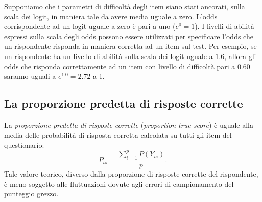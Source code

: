 Supponiamo che i parametri di difficoltà degli item siano stati ancorati, sulla scala dei logit, in maniera tale da avere media uguale a zero. L'odds corrispondente ad un logit uguale a zero è pari a uno ($e^0=1$). I livelli di abilità espressi sulla scala degli odds possono  essere utilizzati per specificare l'odds che un rispondente risponda in maniera corretta ad un item sul test. Per esempio, se un rispondente ha un livello di abilità sulla scala dei logit uguale a $1.6$, allora gli odds che risponda correttamente ad un item con livello di difficoltà pari a $0.60$ saranno uguali a $e^{1.0}=2.72$ a 1.


\subsection{La proporzione predetta di  risposte corrette}

La \emph{proporzione predetta di risposte corrette} ({\it proportion true score}) è uguale alla media delle probabilità di risposta corretta calcolata su tutti gli item del questionario:
\begin{equation}
P_{ts}= \frac{\sum_{i=1}^p P(Y_{vi})}{p}.
\end{equation}
Tale valore teorico, diverso dalla proporzione di risposte corrette del rispondente, è meno soggetto alle fluttuazioni dovute agli errori di campionamento del punteggio grezzo.  


